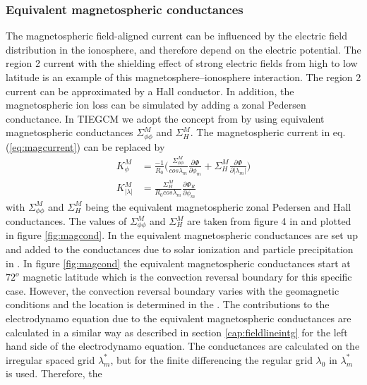 \subsubsection{Equivalent magnetospheric conductances}\label{cap:magncond}
%
The magnetospheric field-aligned current can be influenced by the electric field
distribution in the ionosphere, and therefore depend on the electric potential. The
region 2 current with the shielding effect of strong electric fields from high to low
latitude is an example of this magnetosphere--ionosphere interaction. The region 2
current can be approximated by a Hall conductor. In addition, the 
magnetospheric ion loss
can be simulated by adding a zonal Pedersen conductance. 
In TIEGCM we adopt the concept from
\cite{peym93} by using equivalent magnetospheric conductances 
$\Sigma_{\phi \phi}^M$ and $\Sigma_{H}^M$. 
The magnetospheric current in eq. (\ref{eq:magcurrent}) can
be replaced by
%
\begin{align}
  K_{\phi}^M       &=  \frac{-1}{R_0} \bigl( \frac{\Sigma_{\phi \phi}^M}{cos
   \lambda_m} \frac{\partial \Phi}{\partial \phi_m} + 
   \Sigma_{H}^M \frac{\partial \Phi}{\partial |\lambda_m|} \bigr)  \label{eq:mageqcur_phi}\\
  K_{|\lambda|}^M  &=   \frac{\Sigma_{H}^M}{R_0 cos \lambda_m}
    \frac{ \partial \Phi_R}{\partial \phi_m} \label{eq:mageqcur_lam}
\end{align}
%
with $\Sigma_{\phi \phi}^M$ and $\Sigma_{H}^M$ being the equivalent magnetospheric zonal
Pedersen and Hall conductances. The values of $\Sigma_{\phi \phi}^M$ and $\Sigma_{H}^M$
are taken from figure 4 in \cite{peym93} and plotted in figure \ref{fig:magcond}. In 
 the equivalent magnetospheric conductances 
are set up and added to the conductances due to solar ionization and
particle precipitation in . In figure 
\ref{fig:magcond} the equivalent magnetospheric
conductances start at $72^o$ magnetic latitude which is the 
convection reversal boundary for this specific
case. However, the convection reversal boundary varies with the geomagnetic conditions
and the location is determined in the . 
The contributions to the electrodynamo equation 
due to the equivalent magnetospheric conductances 
 are calculated in a similar way as
described in section \ref{cap:fieldlineintg} for the left hand side of the electrodynamo
equation. The conductances are calculated on the irregular spaced grid $\lambda_m^*$, 
but for the finite differencing the regular grid $\lambda_0$ in
 $\lambda_m^*$ is used. Therefore, the
